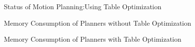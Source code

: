 \begin{figure}[!ht] %
	\centering
	\caption{Status of Motion Planning:Using Table Optimization}
	\label{fig:bm4}
\end{figure}
\begin{figure}[!ht] %
	\centering
	\caption{Memory Consumption of Planners without Table Optimization}
	\label{fig:bm5}
\end{figure}
\begin{figure}[!ht] %
	\centering
	\caption{Memory Consumption of Planners with Table Optimization }
	\label{fig:bm6}
\end{figure}
